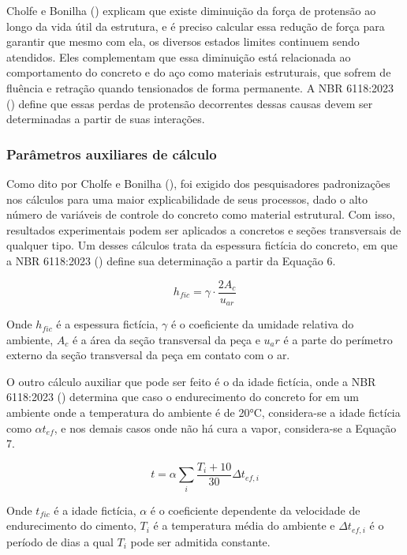 \hspace{0.4cm}Cholfe e Bonilha (\citeyear{CB}) explicam que existe diminuição da força de protensão ao longo da vida útil da estrutura, e é preciso calcular essa redução de força para garantir que mesmo com ela, os diversos estados limites continuem sendo atendidos. Eles complementam que essa diminuição está relacionada ao comportamento do concreto e do aço como materiais estruturais, que sofrem de fluência e retração quando tensionados de forma permanente. A NBR 6118:2023 (\citeyear{NOAB}) define que essas perdas de protensão decorrentes dessas causas devem ser determinadas a partir de suas interações.  
\subsubsection{Parâmetros auxiliares de cálculo}

\hspace{0.4cm}Como dito por Cholfe e Bonilha (\citeyear{CB}), foi exigido dos pesquisadores padronizações nos cálculos para uma maior explicabilidade de seus processos, dado o alto número de variáveis de controle do concreto como material estrutural. Com isso, resultados experimentais podem ser aplicados a concretos e seções transversais de qualquer tipo. Um desses cálculos trata da espessura fictícia do concreto, em que a NBR 6118:2023 (\citeyear{NOAB}) define sua determinação a partir da Equação 6.\bigskip

\begin{equation}
h_{fic} = \gamma \cdot \frac{2A_c}{u_{ar}}
\end{equation}\bigskip

Onde $h_{fic}$ é a espessura fictícia, $\gamma$ é o coeficiente da umidade relativa do ambiente, $A_c$ é a área da seção transversal da peça e $u_ar$ é a parte do perímetro externo da seção transversal da peça em contato com o ar. 

O outro cálculo auxiliar que pode ser feito é o da idade fictícia, onde a NBR 6118:2023 (\citeyear{NOAB}) determina que caso o endurecimento do concreto for em um ambiente onde a temperatura do ambiente é de 20°C, considera-se a idade fictícia como $\alpha t_{ef}$, e nos demais casos onde não há cura a vapor, considera-se a Equação 7.\bigskip

\begin{equation}
t = \alpha \sum_i \frac{T_i + 10}{30} \Delta t_{ef,i}
\end{equation}\bigskip

Onde $t_{fic}$ é a idade fictícia, $\alpha$ é o coeficiente dependente da velocidade de endurecimento do cimento, $T_i$ é a temperatura média do ambiente e $\Delta t_{ef,i}$ é o período de dias a qual $T_i$ pode ser admitida constante.

